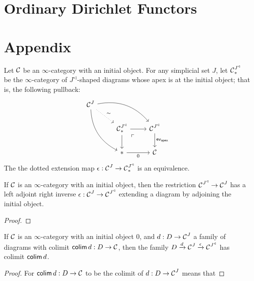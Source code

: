 \section{Ordinary Dirichlet Functors} \label{sec:ordinary.dirichlet.functors}






\section{Appendix}

\begin{lem}\label{lem:cone.initial.equivalence}
Let $\operatorname{\mathcal{C}}$ be an $\infty$-category with an initial object. For any simplicial set
$J$, let $\operatorname{\mathcal{C}}^{J^{\triangleleft}}_{\ast}$ be the $\infty$-category of
  $J^{\triangleleft}$-shaped diagrams whose apex is at the initial object; that
  is, the following pullback:
  \[
    \begin{tikzcd}
      \Ca^{J} \arrow[drr, bend left] \arrow[ddr, bend right] \arrow[dr,
      dotted, "\sim"] & & \\
      & \Ca^{J^{\triangleleft}}_{\ast} \arrow[d] \arrow[r] \arrow[dr, phantom,
      "\ulcorner" very near start] & \Ca^{J^{\triangleleft}} \arrow[d,
      "\term{ev}_{\term{apex}}"] \\
      & \ast \arrow[r, "0"'] & \Ca
    \end{tikzcd}
  \]
The the dotted extension map  $\epsilon : \operatorname{\mathcal{C}}^{J} \to \operatorname{\mathcal{C}}^{J^{\triangleleft}}_{\ast}$ is an equivalence.
\end{lem}

\begin{lem}\label{lem:kan.extending.cone.adds.initial}
If $\operatorname{\mathcal{C}}$ is an $\infty$-category with an initial object, then the restriction
$\operatorname{\mathcal{C}}^{J^{\triangleleft}} \to \operatorname{\mathcal{C}}^{J}$ has a left adjoint right inverse $\epsilon
: \operatorname{\mathcal{C}}^J \to \operatorname{\mathcal{C}}^{J^{\triangleleft}}$ extending a diagram by adjoining the
initial object. 
\end{lem}
\begin{proof}

\end{proof}


\begin{lem}\label{lem:extending.diagram.with.initial.object.has.same.colimit}
If $\operatorname{\mathcal{C}}$ is an $\infty$-category with an initial object $0$, and $d : D \to
\operatorname{\mathcal{C}}^J$ a family of diagrams with colimit $\operatorname{\mathsf{colim}} d : D \to \operatorname{\mathcal{C}}$, then the family
$D \xrightarrow{d} \operatorname{\mathcal{C}}^J \xrightarrow{\epsilon} \operatorname{\mathcal{C}}^{J^{\triangleleft}}$ has colimit $\operatorname{\mathsf{colim}} d$.
\end{lem}
\begin{proof}
For $\operatorname{\mathsf{colim}} d : D \to \operatorname{\mathcal{C}}$ to be the colimit of $d : D \to \operatorname{\mathcal{C}}^J$ means that 
\end{proof}

